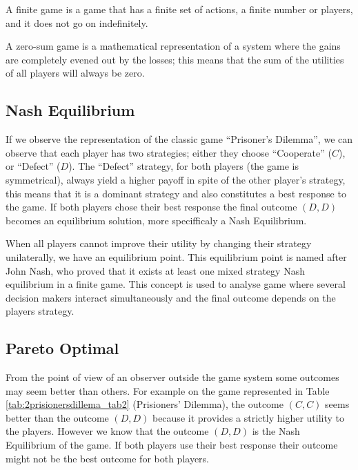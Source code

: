 A finite game is a game that has a finite set of actions, a finite number or players, and it does not go on indefinitely.

A zero-sum game is a mathematical representation of a system where the gains are completely evened out by the losses; this means that the sum of the utilities of all players will always be zero.





\subsection{Nash Equilibrium}
\label{subsec:background:game_theory_nash_equilibrium}

If we observe the representation of the classic game ``Prisoner's Dilemma'', we can observe that each player has two strategies; either they choose ``Cooperate'' ($C$), or ``Defect'' ($D$). The ``Defect'' strategy, for both players (the game is symmetrical), always yield a higher payoff in spite of the other player's strategy, this means that it is a dominant strategy and also constitutes a best response to the game. If both players chose their best response the final outcome $(D,D)$ becomes an equilibrium solution, more specifficaly a Nash Equilibrium. 

When all players cannot improve their utility by changing their strategy unilaterally, we have an equilibrium point. This equilibrium point is named after John Nash, who proved that it exists at least one mixed strategy Nash equilibrium in a finite game\cite{nash50}\cite{Nash51}. This concept is used to analyse game where several decision makers interact simultaneously and the final outcome depends on the players strategy\cite{Osborne2004}.

\subsection{Pareto Optimal}
\label{subsec:background:game_theory_pareto_optimal}

From the point of view of an observer outside the game system some outcomes may seem better than others. For example on the game represented in Table \ref{tab:2prisionersdillema_tab2} (Prisioners' Dilemma), the outcome $(C,C)$ seems better than the outcome $(D,D)$ because it provides a strictly higher utility to the players. However we know that the outcome $(D,D)$ is the Nash Equilibrium of the game. If both players use their best response their outcome might not be the best outcome for both players.

